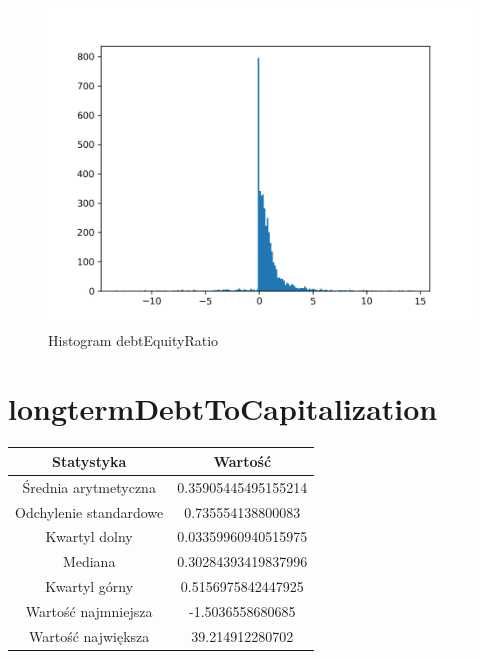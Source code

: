 \documentclass{article}
\begin{document}
\begin{figure}[h!]
    \includegraphics[width=\linewidth]{variables/debtEquityRatio.png}
    \caption{Histogram debtEquityRatio }
\end{figure}\section{ longtermDebtToCapitalization }

\begin{center}
    \begin{tabular}{|c | c|} 
    \hline
    Statystyka & Wartość \\
    \hline\hline
    Średnia arytmetyczna & 0.35905445495155214 \\ 
    \hline
    Odchylenie standardowe & 0.735554138800083 \\
    \hline
    Kwartyl dolny & 0.03359960940515975 \\
    \hline
    Mediana & 0.30284393419837996 \\
    \hline
    Kwartyl górny & 0.5156975842447925 \\
    \hline
    Wartość najmniejsza & -1.5036558680685 \\
    \hline
    Wartość największa & 39.214912280702 \\
    \hline
   \end{tabular}
\end{center}
\end{document}
